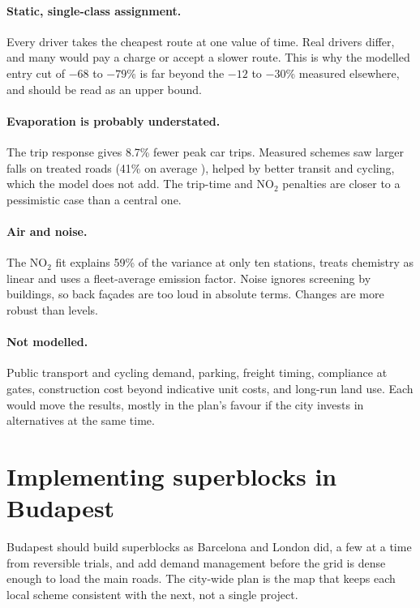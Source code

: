 \documentclass[11pt,a4paper]{article}
\begin{document}
\paragraph{Static, single-class assignment.} Every driver takes the cheapest route at one value of time. Real drivers differ, and many would pay a charge or accept a slower route. This is why the modelled entry cut of $-68$ to $-79$\% is far beyond the $-12$ to $-30$\% measured elsewhere, and should be read as an upper bound.

\paragraph{Evaporation is probably understated.} The trip response gives 8.7\% fewer peak car trips. Measured schemes saw larger falls on treated roads (41\% on average \citep{cairns2002}), helped by better transit and cycling, which the model does not add. The trip-time and NO$_2$ penalties are closer to a pessimistic case than a central one.

\paragraph{Air and noise.} The NO$_2$ fit explains 59\% of the variance at only ten stations, treats chemistry as linear and uses a fleet-average emission factor. Noise ignores screening by buildings, so back façades are too loud in absolute terms. Changes are more robust than levels.

\paragraph{Not modelled.} Public transport and cycling demand, parking, freight timing, compliance at gates, construction cost beyond indicative unit costs, and long-run land use. Each would move the results, mostly in the plan's favour if the city invests in alternatives at the same time.

\section{Implementing superblocks in Budapest}\label{sec:implementation}

Budapest should build superblocks as Barcelona and London did, a few at a time from reversible trials, and add demand management before the grid is dense enough to load the main roads. The city-wide plan is the map that keeps each local scheme consistent with the next, not a single project.
\end{document}
